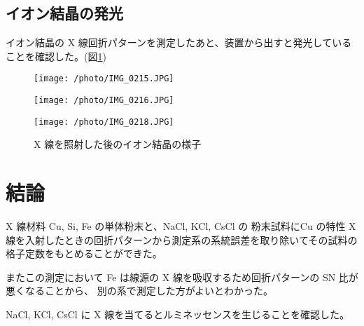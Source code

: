 \documentclass[11pt,dvipdfmx,a4paper]{jsarticle}
\begin{document}
\subsection{イオン結晶の発光}
イオン結晶の X 線回折パターンを測定したあと、装置から出すと発光していることを確認した。(図\ref{photo:ion})
\begin{figure}[H]
	\begin{minipage}[t]{0.3\columnwidth}
		\centering
		\texttt{[image: /photo/IMG\_0215.JPG]}
	\end{minipage}
	\hfill
	\begin{minipage}[t]{0.3\columnwidth}
		\centering
		\texttt{[image: /photo/IMG\_0216.JPG]}
	\end{minipage}
	\hfill
	\begin{minipage}[t]{0.3\columnwidth}
		\centering
		\texttt{[image: /photo/IMG\_0218.JPG]}
	\end{minipage}
	\caption{X 線を照射した後のイオン結晶の様子}
	\label{photo:ion}
\end{figure}


\section{結論}
X 線材料 Cu, Si, Fe の単体粉末と、NaCl, KCl, CsCl の
粉末試料にCu の特性 X 線を入射したときの回折パターンから測定系の系統誤差を取り除いてその試料の格子定数をもとめることができた。

またこの測定において Fe は線源の X 線を吸収するため回折パターンの SN 比が悪くなることから、
別の系で測定した方がよいとわかった。

NaCl, KCl, CsCl に X 線を当てるとルミネッセンスを生じることを確認した。



\end{document}
